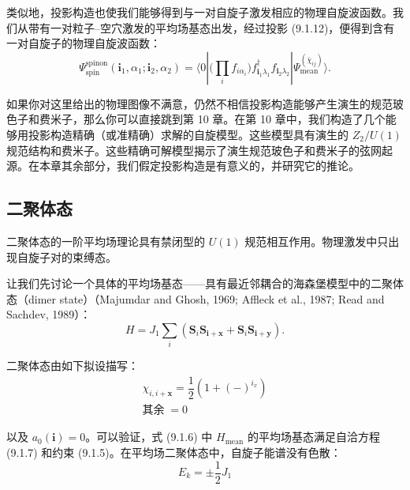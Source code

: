 类似地，投影构造也使我们能够得到与一对自旋子激发相应的物理自旋波函数。我们从带有一对粒子–空穴激发的平均场基态出发，经过投影 (9.1.12)，便得到含有一对自旋子的物理自旋波函数：
\begin{equation*}
\Psi^{\text{spinon}}_{\text{spin}}(\pmb{i}_1,\alpha_1;\pmb{i}_2,\alpha_2)=\langle 0|\Big(\prod_{i}f_{i\alpha_i}\Big)f^{\dagger}_{\pmb{i}_1\lambda_1}f_{\pmb{i}_2\lambda_2}|\Psi^{(\bar{\chi}_{ij})}_{\text{mean}}\rangle.
\end{equation*}

如果你对这里给出的物理图像不满意，仍然不相信投影构造能够产生演生的规范玻色子和费米子，那么你可以直接跳到第 10 章。在第 10 章中，我们构造了几个能够用投影构造精确（或准精确）求解的自旋模型。这些模型具有演生的 $Z_2/U(1)$ 规范结构和费米子。这些精确可解模型揭示了演生规范玻色子和费米子的弦网起源。在本章其余部分，我们假定投影构造是有意义的，并研究它的推论。


\subsection{二聚体态}

\begin{keypoints}
\item 二聚体态的一阶平均场理论具有禁闭型的 $U(1)$ 规范相互作用。物理激发中只出现自旋子对的束缚态。
\end{keypoints}

让我们先讨论一个具体的平均场基态——具有最近邻耦合的海森堡模型中的二聚体态（dimer state）（Majumdar and Ghosh, 1969; Affleck et al., 1987; Read and Sachdev, 1989）：
\begin{equation*}
H=J_1\sum_{i}\left(\pmb{S}_i\pmb{S}_{\pmb{i}+\pmb{x}}+\pmb{S}_i\pmb{S}_{\pmb{i}+\pmb{y}}\right).
\tag{9.1.15}
\end{equation*}

二聚体态由如下拟设描写：
\begin{equation*}
\begin{array}{l}
\chi_{i,i+\pmb{x}}=\dfrac{1}{2}\left(1+(-)^{i_x}\right)\\[6pt]
\text{其余}\;=0
\end{array}
\tag{9.1.16}
\end{equation*}

以及 $a_0(\pmb{i})=0$。可以验证，式 (9.1.6) 中 $H_{\text{mean}}$ 的平均场基态满足自洽方程 (9.1.7) 和约束 (9.1.5)。在平均场二聚体态中，自旋子能谱没有色散：
\begin{equation*}
E_k=\pm\frac{1}{2}J_1
\tag{9.1.17}
\end{equation*}

